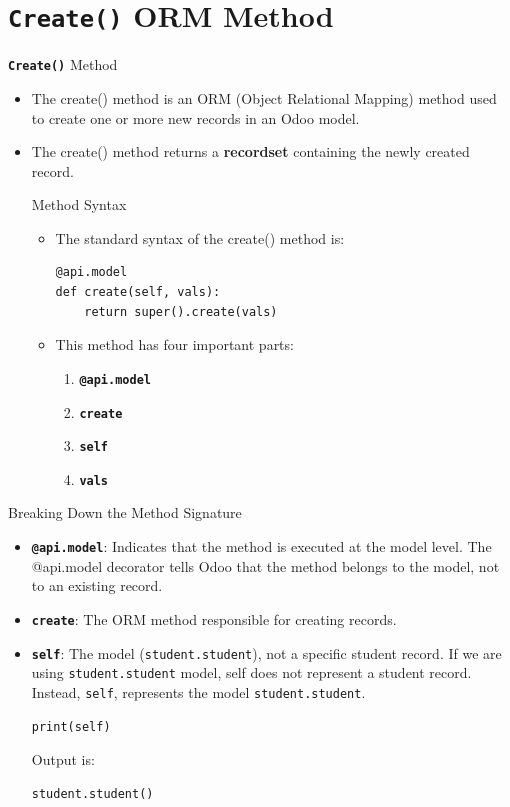 \section{\textbf{\texttt{Create()}} ORM Method}

\begin{frame}[fragile]{\textbf{\texttt{Create()}} Method}
	\begin{itemize}
		\item The create() method is an ORM (Object Relational Mapping) method used to create one or more new records in an Odoo model.
		\item The create() method returns a \textbf{recordset} containing the newly created record.

\begin{block}{Method Syntax}
	\begin{itemize}
		\item The standard syntax of the create() method is:
	\begin{lstlisting}
@api.model
def create(self, vals):
	return super().create(vals)
\end{lstlisting}
	\item This method has four important parts:
	\begin{enumerate}
		\item \textbf{\texttt{@api.model}}
		\item \textbf{\texttt{create}}
		\item \textbf{\texttt{self}}
		\item \textbf{\texttt{vals}}
	\end{enumerate}
		\end{itemize}
\end{block}
	\end{itemize}
\end{frame}

\begin{frame}[fragile]{Breaking Down the Method Signature}
	\begin{block}{}
		\begin{itemize}
			\item \textbf{\texttt{@api.model}}: Indicates that the method is executed at the model level. The @api.model decorator tells Odoo that the method belongs to the model, not to an existing record.
			\item \textbf{\texttt{create}}: The ORM method responsible for creating records.
			\item \textbf{\texttt{self}}: The model (\texttt{student.student}), not a specific student record. If we are using \texttt{student.student} model, self does not represent a student record. Instead, \texttt{self}, represents the model \texttt{student.student}.
			\begin{lstlisting}
print(self)
\end{lstlisting}
			Output is:
			\begin{lstlisting}
student.student()
\end{lstlisting}
		\end{itemize}
	\end{block}
\end{frame}

